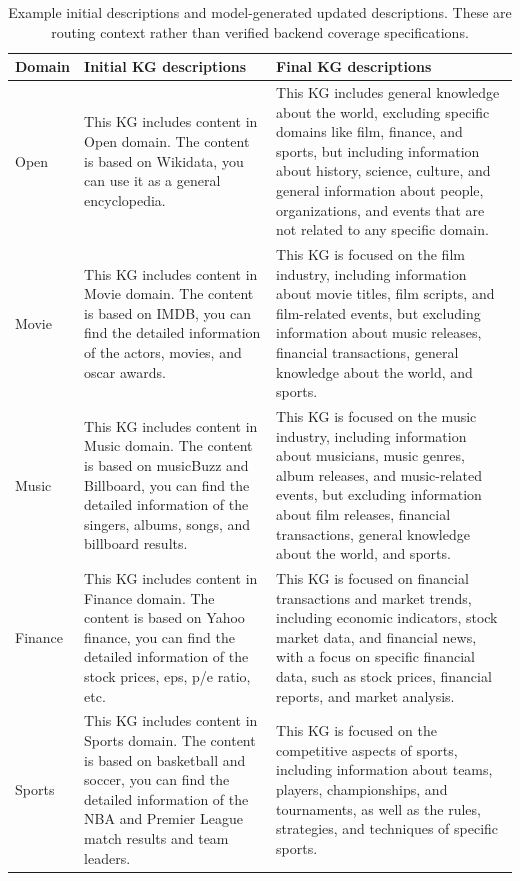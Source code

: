 \begin{table}[t]
	
	\centering
	\caption{Example initial descriptions and model-generated updated descriptions. These are routing context rather than verified backend coverage specifications.}
	\label{tab:example-domain}
	\small
\begin{tabularx}{\textwidth}{p{1.2cm}>{\raggedright\arraybackslash}X>{\raggedright\arraybackslash}X}
		\toprule
		\textbf{Domain}             & \textbf{Initial KG descriptions} & \textbf{Final KG descriptions} \\    
		\midrule
		Open & This KG includes content in Open domain. The content is based on Wikidata, you can use it as a general encyclopedia. & This KG includes general knowledge about the world, excluding specific domains like film, finance, and sports, but including information about history, science, culture, and general information about people, organizations, and events that are not related to any specific domain.\\
            Movie & This KG includes content in Movie domain. The content is based on IMDB, you can find the detailed information of the actors, movies, and oscar awards. & This KG is focused on the film industry, including information about movie titles, film scripts, and film-related events, but excluding information about music releases, financial transactions, general knowledge about the world, and sports.\\
            Music & This KG includes content in Music domain. The content is based on musicBuzz and Billboard, you can find the detailed information of the singers, albums, songs, and billboard results. & This KG is focused on the music industry, including information about musicians, music genres, album releases, and music-related events, but excluding information about film releases, financial transactions, general knowledge about the world, and sports. \\
            Finance & This KG includes content in Finance domain. The content is based on Yahoo finance, you can find the detailed information of the stock prices, eps, p/e ratio, etc. & This KG is focused on financial transactions and market trends, including economic indicators, stock market data, and financial news, with a focus on specific financial data, such as stock prices, financial reports, and market analysis.\\
            Sports & This KG includes content in Sports domain. The content is based on basketball and soccer, you can find the detailed information of the NBA and Premier League match results and team leaders. & This KG is focused on the competitive aspects of sports, including information about teams, players, championships, and tournaments, as well as the rules, strategies, and techniques of specific sports.\\
		\bottomrule
	\end{tabularx}
\end{table}

